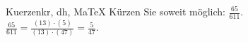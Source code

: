 \begin{MAufgabe}{Kuerzen}{kr, dh, MaTeX}
K\"urzen Sie soweit m\"oglich: $\frac{65}{611}$.\\ 
\ifLsg\MLoesung
\quad $\frac{65}{611}=\frac{(13)\cdot(5)}{(13)\cdot(47)}=\frac{5}{47}$.\else\relax\fi
 \end{MAufgabe}